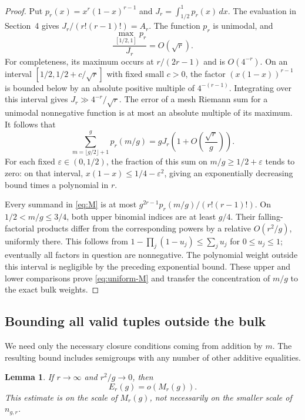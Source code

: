 \documentclass[11pt]{article}
\newtheorem{lemma}[theorem]{Lemma}
\theoremstyle{remark}\newtheorem{remark}[theorem]{Remark}
\begin{document}
\begin{proof}
Put $p_r(x)=x^r(1-x)^{r-1}$ and $J_r=\int_{1/2}^1p_r(x)\,dx$.
The evaluation in Section~4 gives $J_r/(r!(r-1)!)=A_r$. The function
$p_r$ is unimodal, and
\[
\frac{\max_{[1/2,1]}p_r}{J_r}=O(\sqrt r).
\]
For completeness, its maximum occurs at $r/(2r-1)$ and is
$O(4^{-r})$. On an interval $[1/2,1/2+c/\sqrt r]$ with fixed small
$c>0$, the factor $(x(1-x))^{r-1}$ is bounded below by an absolute
positive multiple of $4^{-(r-1)}$. Integrating over this interval gives
$J_r\gg4^{-r}/\sqrt r$.
The error of a mesh Riemann sum for a unimodal nonnegative function is
at most an absolute multiple of its maximum. It follows that
\[
\sum_{m=\lfloor g/2\rfloor+1}^{g}p_r(m/g)
=gJ_r\left(1+O\left(\frac{\sqrt r}{g}\right)\right).
\]
For each fixed $\varepsilon\in(0,1/2)$, the fraction of this sum on
$m/g\ge1/2+\varepsilon$ tends to zero: on that interval,
$x(1-x)\le1/4-\varepsilon^2$, giving an exponentially decreasing
bound times a polynomial in $r$.

Every summand in \eqref{eq:M} is at most
$g^{2r-1}p_r(m/g)/(r!(r-1)!)$. On $1/2<m/g\le3/4$, both upper
binomial indices are at least $g/4$. Their falling-factorial products
differ from the corresponding powers by a relative $O(r^2/g)$,
uniformly there. This follows from
$1-\prod_j(1-u_j)\le\sum_j u_j$ for $0\le u_j\le1$; eventually
all factors in question are nonnegative. The polynomial weight outside
this interval is negligible by the preceding exponential bound.
These upper and lower comparisons prove \eqref{eq:uniform-M} and
transfer the concentration of $m/g$ to the exact bulk weights.
\end{proof}

\subsection{Bounding all valid tuples outside the bulk}

We need only the necessary closure conditions coming from addition by
$m$. The resulting bound includes semigroups with any number of other
additive equalities.

\begin{lemma}\label{lem:outside-bulk}
If $r\to\infty$ and $r^2/g\to0$, then
\begin{equation}\label{eq:outside-small}
E_r(g)=o(M_r(g)).
\end{equation}
This estimate is on the scale of $M_r(g)$, not necessarily on the
smaller scale of $n_{g,r}$.
\end{lemma}
\end{document}
